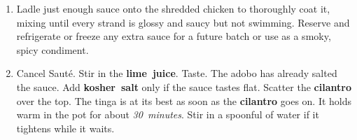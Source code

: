 \documentclass[11pt,letterpaper]{article}
\begin{document}
\begin{enumerate}
    \item Ladle just enough sauce onto the shredded chicken to thoroughly coat it, mixing until every strand is glossy and saucy but not swimming. Reserve and refrigerate or freeze any extra sauce for a future batch or use as a smoky, spicy condiment.

    \item Cancel Sauté. Stir in the \textbf{lime~juice}. Taste. The adobo has already salted the sauce. Add \textbf{kosher~salt} only if the sauce tastes flat. Scatter the \textbf{cilantro} over the top. The tinga is at its best as soon as the \textbf{cilantro} goes on. It holds warm in the pot for about \textit{30~minutes}. Stir in a spoonful of water if it tightens while it waits.
\end{enumerate}

\newpage
\end{document}
